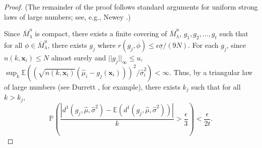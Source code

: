 \documentclass[12pt]{article}
\newcommand{\des}{\ensuremath{\bm{x}}}
\begin{document}
\begin{proof}
    (The remainder of the proof follows standard arguments for uniform strong laws of large numbers; see, e.g., Newey \cite{newey1991uniform}.)

    Since $\overline{M}^u_\lambda$ is compact, there exists a finite covering of $\overline{M}^u_\lambda$, $g_1,g_2,\ldots,g_t$ such that for all $\phi \in \overline{M}^u_\lambda$, there exists $g_j$ where $r(g_j,\phi)\leq \epsilon\underline{\sigma}/(9N)$. For each $g_j$, since $n(k,\des_i)\leq N$ almost surely and $||g_j||_\infty\leq u$, $\sup_k \mathbb{E}\left ((\sqrt{n(k,\des_i)}(\hat{\mu}_i-g_j(\des_i)))^2/\hat{\sigma}^2_i\right )<\infty$. Thus, by a triangular law of large numbers (see Durrett \cite{durrett2019probability}, for example), there exists $k_j$ such that for all $k>k_j$,
    $$\mathbb{P}\left (\frac{|d^1(g_j,\hat{\mu},\hat{\sigma}^2)-\mathbb{E}\left ( d^1(g_j,\hat{\mu},\hat{\sigma}^2)\right )|}{k}>\frac{\epsilon}{3}\right )<\frac{\epsilon}{2t}.$$
    

\end{proof}
\end{document}
